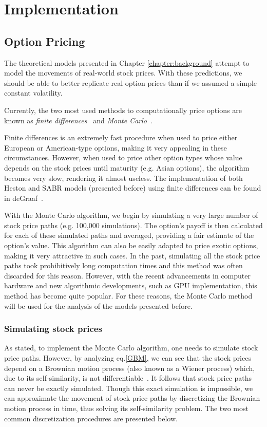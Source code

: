 \chapter{Implementation}
\label{chapter:implementation}
\section{Option Pricing}
\label{section:Option Pricing}
The theoretical models presented in Chapter \ref{chapter:background} attempt to model the movements of real-world stock prices. With these predictions, we should be able to better replicate real option prices than if we assumed a simple constant volatility.

Currently, the two most used methods to computationally price options are known as \emph{finite differences}~\cite{Hull} and \emph{Monte Carlo}~\cite{Glasserman}.

Finite differences is an extremely fast procedure when used to price either European or American-type options, making it very appealing in these circumstances. However, when used to price other option types whose value depends on the stock prices until maturity (e.g. Asian options), the algorithm becomes very slow, rendering it almost useless.
The implementation of both Heston and SABR models (presented before) using finite differences can be found in deGraaf~\cite{deGraaf}.


With the Monte Carlo algorithm, we begin by simulating a very large number of stock price paths (e.g. 100,000 simulations). The option's payoff is then calculated for each of these simulated paths and averaged, providing a fair estimate of the option's value. This algorithm can also be easily adapted to price exotic options, making it very attractive in such cases.
In the past, simulating all the stock price paths took prohibitively long computation times and this method was often discarded for this reason. However, with the recent advancements in computer hardware and new algorithmic developments, such as GPU implementation, this method has become quite popular.
For these reasons, the Monte Carlo method will be used for the analysis of the models presented before.


\subsection{Simulating stock prices}
\label{subsection:Simulating stock prices}
As stated, to implement the Monte Carlo algorithm, one needs to simulate stock price paths. However, by analyzing eq.\eqref{GBM}, we can see that the stock prices depend on a Brownian motion process (also known as a Wiener process) which, due to its self-similarity, is not differentiable~\cite{Mikosch}. It follows that stock price paths can never be exactly simulated. Though this exact simulation is impossible, we can approximate the movement of stock price paths by discretizing the Brownian motion process in time, thus solving its self-similarity problem. The two most common discretization procedures are presented below.

